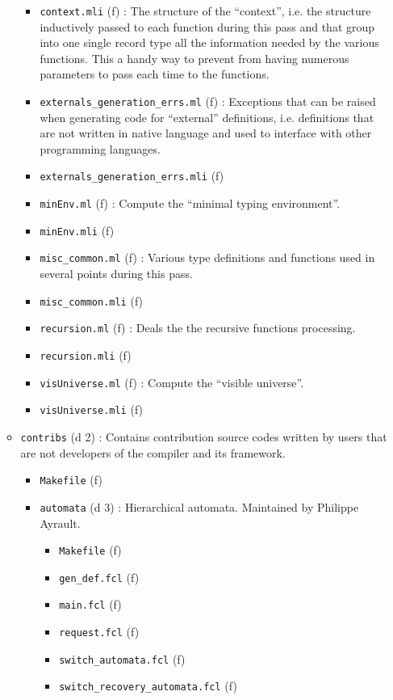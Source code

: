 \begin{itemize}
\begin{itemize}
\begin{itemize}
    \item {\tt context.mli} (f) : The structure of the ``context'',
      i.e. the structure inductively passed to each function during
      this pass and that group into one single record type all the
      information needed by the various functions. This a handy way to
      prevent from having numerous parameters to pass each time to the
      functions.
    \item {\tt externals\_generation\_errs.ml} (f) : Exceptions that
      can be raised when generating code for ``external'' definitions,
      i.e. definitions that are not written in native \focalize
      language and used to interface with other programming languages.
    \item {\tt externals\_generation\_errs.mli} (f)
    \item {\tt minEnv.ml} (f) : Compute the ``\coq minimal typing
      environment''.
    \item {\tt minEnv.mli} (f)
    \item {\tt misc\_common.ml} (f) : Various type definitions and
      functions used in several points during this pass.
    \item {\tt misc\_common.mli} (f)
    \item {\tt recursion.ml} (f) : Deals the the recursive
      functions processing.
    \item {\tt recursion.mli} (f)
    \item {\tt visUniverse.ml} (f) : Compute the ``visible
      universe''.
    \item {\tt visUniverse.mli} (f)
    \end{itemize}
  \item {\tt contribs} (d 2) : Contains contribution source codes written
    by users that are not developers of the compiler and its framework.
    \begin{itemize}
    \item {\tt Makefile} (f)
    \item {\tt automata} (d 3) : Hierarchical automata. Maintained by
      Philippe Ayrault.
      \begin{itemize}
      \item {\tt Makefile} (f)
      \item {\tt gen\_def.fcl} (f)
      \item {\tt main.fcl} (f)
      \item {\tt request.fcl} (f)
      \item {\tt switch\_automata.fcl} (f)
      \item {\tt switch\_recovery\_automata.fcl} (f)

\end{itemize}
\end{itemize}
\end{itemize}
\end{itemize}
